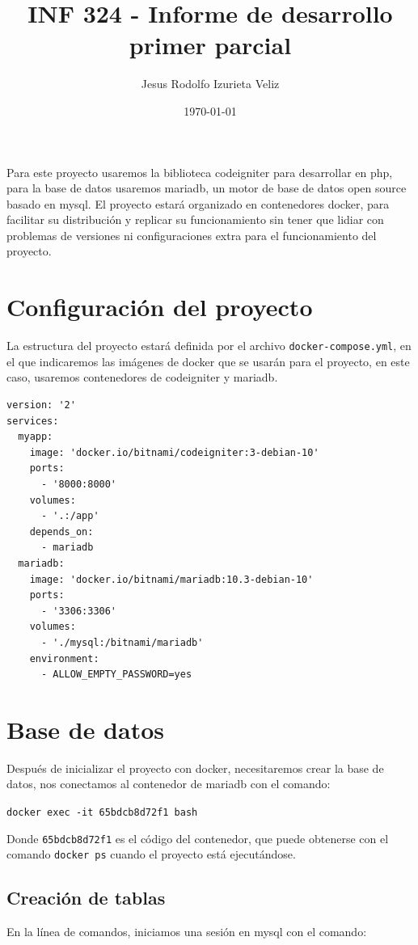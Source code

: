 \documentclass[letter]{article}
\author{Jesus Rodolfo Izurieta Veliz}
\date{\today}
\title{INF 324 - Informe de desarrollo primer parcial}
\begin{document}
\maketitle
Para este proyecto usaremos la biblioteca codeigniter para desarrollar en php,
para la base de datos usaremos mariadb, un motor de base de datos open source
basado en mysql. El proyecto estará organizado en contenedores docker, para
facilitar su distribución y replicar su funcionamiento sin tener que lidiar con
problemas de versiones ni configuraciones extra para el funcionamiento del
proyecto.

\section{Configuración del proyecto}
\label{sec:org9ae6446}
La estructura del proyecto estará definida por el archivo \texttt{docker-compose.yml},
en el que indicaremos las imágenes de docker que se usarán para el proyecto, en
este caso, usaremos contenedores de codeigniter y mariadb.

\begin{verbatim}
version: '2'
services:
  myapp:
    image: 'docker.io/bitnami/codeigniter:3-debian-10'
    ports:
      - '8000:8000'
    volumes:
      - '.:/app'
    depends_on:
      - mariadb
  mariadb:
    image: 'docker.io/bitnami/mariadb:10.3-debian-10'
    ports:
      - '3306:3306'
    volumes:
      - './mysql:/bitnami/mariadb'
    environment:
      - ALLOW_EMPTY_PASSWORD=yes
\end{verbatim}

\section{Base de datos}
\label{sec:orgfbc4f55}
Después de inicializar el proyecto con docker, necesitaremos crear la base de
datos, nos conectamos al contenedor de mariadb con el comando:

\texttt{docker exec -it 65bdcb8d72f1 bash}

Donde \texttt{65bdcb8d72f1} es el código del contenedor, que puede obtenerse con el
comando \texttt{docker ps} cuando el proyecto está ejecutándose.

\subsection{Creación de tablas}
\label{sec:orgcbb18e7}
En la línea de comandos, iniciamos una sesión en mysql con el comando:
\end{document}
